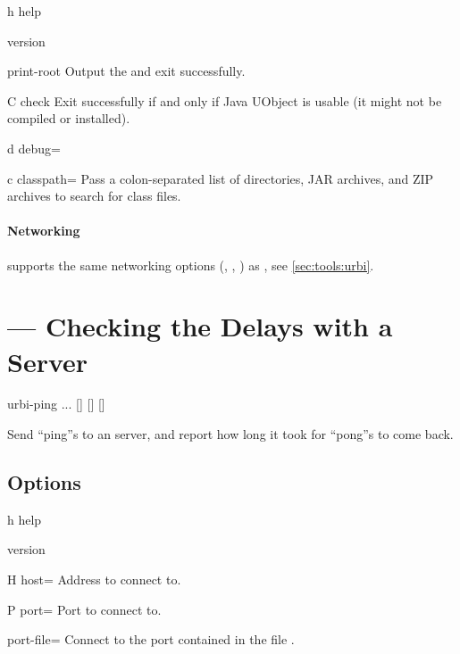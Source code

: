 \begin{options}[Options]
\item[h]{help} \optionHelp
\item{version} \optionVersion
\item{print-root} Output the  and exit successfully.
\item[C]{check} Exit successfully if and only if Java UObject is usable (it
  might not be compiled or installed).
\item[d]{debug=} \optionDebug
\end{options}

\begin{options}[Java]
\item[c]{classpath=} Pass a colon-separated list of directories,
  JAR archives, and ZIP archives to search for class files.
\end{options}

\paragraph{Networking}
 supports the same networking options
(, , ) as ,
see \autoref{sec:tools:urbi}.


\section{ --- Checking the Delays with a Server}
\label{sec:tools:urbi-ping}

\begin{shell}
urbi-ping ... [] [] []
\end{shell}

Send ``ping''s to an \urbi server, and report how long it took for ``pong''s
to come back.

\subsection{Options}

\begin{options}
\item[h]{help} \optionHelp
\item{version} \optionVersion
\end{options}

\begin{options}[Networking]
\item[H]{host=} Address to connect to.
\item[P]{port=} Port to connect to.
\item{port-file=} Connect to the port contained in the file
  .
\end{options}

